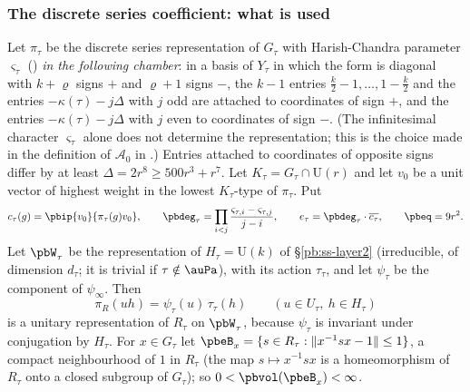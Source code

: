 \documentclass[10pt]{amsart}
\theoremstyle{definition}
\theoremstyle{remark}
\providecommand{\auAz}{\mathcal A_0}
\providecommand{\auU}{\mathrm U}
\providecommand{\aubar}[1]{\overline{#1}}
\begin{document}
\subsubsection{The discrete series coefficient: what is used}\label{pbe:ss-ds}

Let $\pi_\tau$ be the discrete series representation of $G_\tau$ with Harish-Chandra parameter
$\varsigma_\tau$ ({\cite[\S14.3]{P46}}) \emph{in the following chamber}: in a basis of $Y_\tau$ in
which the form is diagonal with $k+\varrho$ signs $+$ and $\varrho+1$ signs $-$, the $k-1$ entries
$\frac k2-1,\dots,1-\frac k2$ and the entries $-\kappa(\tau)-j\Delta$ with $j$ odd are attached to
coordinates of sign $+$, and the entries $-\kappa(\tau)-j\Delta$ with $j$ even to coordinates of sign
$-$. (The infinitesimal character $\varsigma_\tau$ alone does not determine the representation; this
is the choice made in the definition of $\auAz$ in {\cite[\S14.3]{P46}}.) Entries attached to coordinates of opposite signs differ by at least
$\Delta=2r^8\ge500r^3+r^7$. Let $K_\tau=G_\tau\cap\auU(r)$ and let $v_0$ be a unit vector of highest
weight in the lowest $K_\tau$-type of $\pi_\tau$. Put
\[
c_\tau(g)=\pbip{v_0}{\pi_\tau(g)v_0},\qquad\pbdeg_\tau=\prod_{i<j}\frac{\varsigma_{\tau,i}-
\varsigma_{\tau,j}}{j-i},\qquad e_\tau=\pbdeg_\tau\cdot\aubar{c_\tau},\qquad\pbeq=9r^2 .
\]
Let $\pbW_\tau$ be the representation of $H_\tau=\auU(k)$ of \S\ref{pb:ss-layer2} (irreducible, of
dimension $d_\tau$; it is trivial if $\tau\notin\auPa$), with its action $\tau_\tau$, and let
$\psi_\tau$ be the component of $\psi_\infty$. Then
\[
\pi_R(uh)=\psi_\tau(u)\,\tau_\tau(h)\qquad(u\in U_\tau,\ h\in H_\tau)
\]
is a unitary representation of $R_\tau$ on $\pbW_\tau$, because $\psi_\tau$ is invariant under
conjugation by $H_\tau$. For $x\in G_\tau$ let $\pbeB_x=\{s\in R_\tau:\|x^{-1}sx-1\|\le1\}$, a
compact neighbourhood of $1$ in $R_\tau$ (the map $s\mapsto x^{-1}sx$ is a homeomorphism of $R_\tau$
onto a closed subgroup of $G_\tau$); so $0<\pbvol(\pbeB_x)<\infty$.
\end{document}
